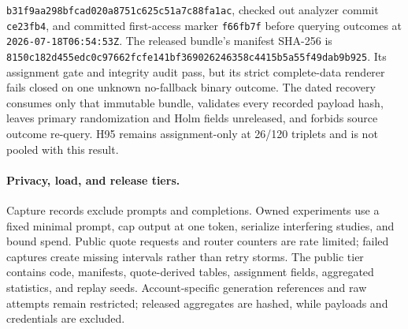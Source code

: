 \documentclass[11pt]{article}
\newcommand{\1}{\mathbf{1}}
\begin{document}
\nolinkurl{b31f9aa298bfcad020a8751c625c51a7c88fa1ac}, checked out analyzer
commit \texttt{ce23fb4}, and committed first-access marker
\texttt{f66fb7f} before querying outcomes at
\texttt{2026-07-18T06:54:53Z}.  The released bundle's manifest SHA-256 is
\nolinkurl{8150c182d455edc0c97662fcfe141bf369026246358c4415b5a55f49dab9b925}.
Its assignment gate and integrity audit pass, but its strict complete-data
renderer fails closed on one unknown no-fallback binary outcome.  The dated
recovery consumes only that immutable bundle, validates every recorded payload
hash, leaves primary randomization and Holm fields unreleased, and forbids source
outcome re-query.  H95 remains assignment-only at 26/120 triplets and is not
pooled with this result.

\paragraph{Privacy, load, and release tiers.}
Capture records exclude prompts and completions.  Owned experiments use a fixed
minimal prompt, cap output at one token, serialize interfering studies, and bound
spend.  Public quote requests and router counters are rate limited; failed
captures create missing intervals rather than retry storms.  The public tier
contains code, manifests, quote-derived tables, assignment fields, aggregated
statistics, and replay seeds.  Account-specific generation references and raw
attempts remain restricted; released aggregates are hashed, while payloads and
credentials are excluded.
\end{document}
